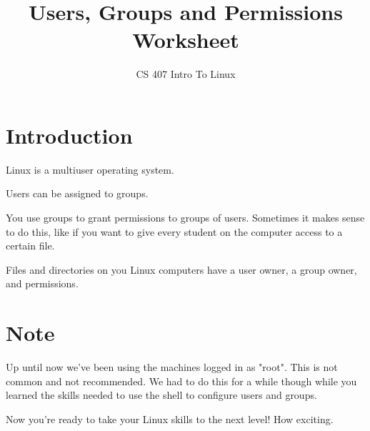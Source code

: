\documentclass[12pt,a4]{article}
\begin{document}
\title{Users, Groups and Permissions Worksheet}
\author{CS 407 Intro To Linux}
\maketitle

\section{Introduction}
Linux is a multiuser operating system.

Users can be assigned to groups. 

You use groups to grant permissions to groups of users. Sometimes it makes sense to do this, like if you want to give every student on the computer access to a certain file.

Files and directories on you Linux computers have a user owner, a group owner, and permissions.

\section{Note}
Up until now we've been using the machines logged in as "root". This is not common and not recommended. We had to do this for a while though while you learned the skills needed to use the shell to configure users and groups.

Now you're ready to take your Linux skills to the next level! How exciting.
\end{document}
